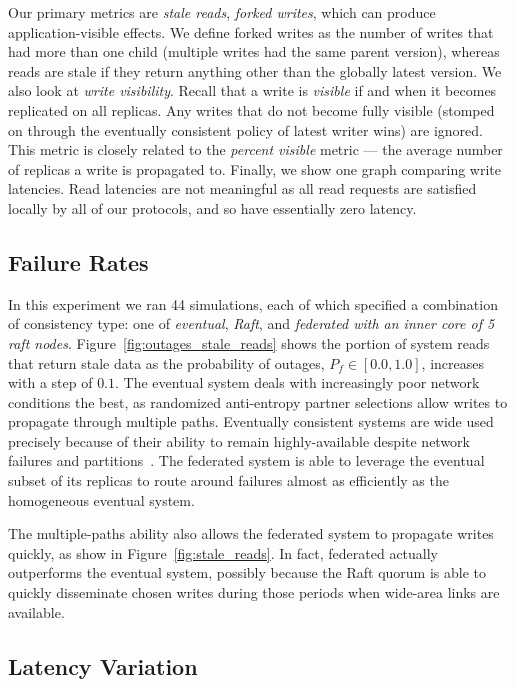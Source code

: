 \documentclass[10pt,conference,letterpaper]{IEEEtran}
\begin{document}
Our primary metrics are \textit{stale reads}, \textit{forked writes}, which can produce
application-visible effects.
We define forked writes as the number of writes that had more than one child (multiple
writes had the same parent version), whereas reads are stale if they return anything other
than the globally latest version.
We also look at \emph{write visibility}.
Recall that a write is \emph{visible} if and when it becomes replicated on all replicas.
Any writes that do not become fully visible (stomped on through the eventually consistent
policy of latest writer wins) are ignored.
This metric is closely related to the \textit{percent visible} metric --- the average
number of replicas a write is propagated to.
Finally, we show one graph comparing write latencies.
Read latencies are not meaningful as all read requests are satisfied locally by all of our
protocols, and so have essentially zero latency.

\subsection{Failure Rates}

In this experiment we ran 44 simulations, each of which specified a combination of
consistency type: one of \textit{eventual}, \textit{Raft}, and
\textit{federated with an inner core of 5 raft nodes}.
Figure~\ref{fig:outages_stale_reads} shows the portion of system reads that return stale
data as the probability of outages, $P_f \in [0.0,1.0]$, increases with a step of $0.1$.
The eventual system deals with increasingly poor network conditions the best,
as randomized anti-entropy partner selections allow writes to propagate through multiple
paths. 
Eventually consistent systems are wide used precisely because of their ability to remain
highly-available despite network failures and
partitions~\cite{bailis_bolt-causal_2013,bailis_probabilistically_2012,bailis_quantifying_2014}. 
The federated system is able to leverage the eventual subset of its replicas to route
around failures almost as efficiently as the homogeneous eventual system.

The multiple-paths ability also allows the federated system to propagate writes quickly,
as show in Figure~\ref{fig:stale_reads}. In fact, federated actually outperforms the
eventual system, possibly because the Raft quorum is able to quickly disseminate chosen
writes during those periods when wide-area links are available.

\subsection{Latency Variation}
\end{document}
